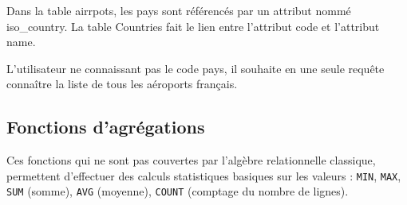 \documentclass[10pt]{article}
\newif\ifprof
\begin{document}
\begin{exemple}
Dans la table airrpots, les pays sont référencés par un attribut nommé iso\_country. La table Countries fait le lien entre l'attribut code et l'attribut name. 

L'utilisateur ne connaissant pas le code pays, il souhaite en une seule requête connaître la liste de tous les aéroports français. 
\ifprof
$$
\pi_{\text{name}}\left( 
\pi_{\text{name,code}}\left(\text{Countries}  \right)
\underset{\text{airports.iso\_country}=\text{Countries.code}}{\bowtie }
\pi_{\text{name,iso\_country}}\left( \text{airports}  \right)
\right)
$$

\begin{envsql}
\begin{sql}
SELECT name FROM 
    (SELECT name, iso_country FROM airports) AS aeroports
    INNER JOIN 
    (SELECT Countries.code from Countries WHERE name="France") AS pays     
        ON aeroports.iso_country=pays.code
\end{sql}
\end{envsql}
\else
\vspace{6cm}
\fi


\end{exemple}

\subsection{Fonctions d'agrégations}
\begin{defi}
Ces fonctions qui ne sont pas couvertes par l’algèbre relationnelle 
classique, permettent d’effectuer des calculs statistiques basiques sur les valeurs : \texttt{MIN}, \texttt{MAX}, \texttt{SUM} 
(somme), \texttt{AVG} (moyenne), \texttt{COUNT} (comptage du nombre de lignes). 

\end{defi}
\end{document}
